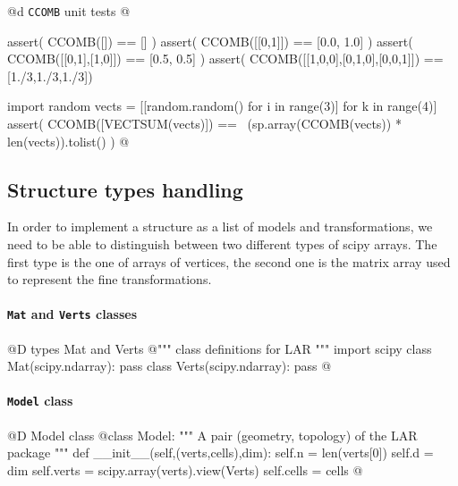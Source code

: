 \documentclass[11pt,oneside]{article}	%
\begin{document}
@d \texttt{CCOMB} unit tests
@{assert( CCOMB([]) == [] )
assert( CCOMB([[0,1]]) == [0.0, 1.0] )
assert( CCOMB([[0,1],[1,0]]) == [0.5, 0.5] )
assert( CCOMB([[1,0,0],[0,1,0],[0,0,1]]) == [1./3,1./3,1./3])

import random
vects = [[random.random() for i in range(3)] for k in range(4)]
assert( CCOMB([VECTSUM(vects)]) == \
        (sp.array(CCOMB(vects)) * len(vects)).tolist() )
@}





\subsection{Structure types handling}

In order to implement a structure as a list of models and transformations, we need to be able to distinguish between two different types of scipy arrays. The first type is the one of arrays of vertices, the second one is the matrix array used to represent the fine transformations.

\paragraph{\texttt{Mat} and \texttt{Verts} classes}
@D types Mat and Verts
@{""" class definitions for LAR """
import scipy
class Mat(scipy.ndarray): pass
class Verts(scipy.ndarray): pass
@}

\paragraph{\texttt{Model} class}
@D Model class
@{class Model:
	""" A pair (geometry, topology) of the LAR package """
	def __init__(self,(verts,cells),dim):
		self.n = len(verts[0])
		self.d = dim
		self.verts = scipy.array(verts).view(Verts)
		self.cells = cells
@}
\end{document}
